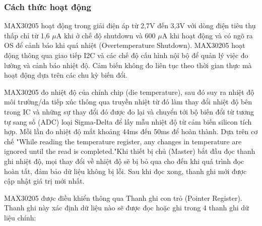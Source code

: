 \documentclass[../DoAn.tex]{subfiles}
\begin{document}
\subsubsection{Cách thức hoạt động}
MAX30205 hoạt động trong giải điện áp từ 2,7V đến 3,3V với dòng điện tiêu thụ thấp chỉ từ 1,6 $\mu$A khi ở chế độ shutdown và 600 $\mu$A khi hoạt động và có ngõ ra OS để cảnh báo khi quá nhiệt (Overtemperature Shutdown). MAX30205 hoạt động thông qua giao tiếp I2C và các chế độ cấu hình nội bộ để quản lý việc đo lường và cảnh báo nhiệt độ. Cảm biến không đo liên tục theo thời gian thực mà hoạt động dựa trên các chu kỳ biến đổi.

MAX30205 đo nhiệt độ của chính chip (die temperature), sau đó suy ra nhiệt độ môi trường/da tiếp xúc thông qua truyền nhiệt từ đó làm thay đổi nhiệt độ bên trong IC và những sự thay đổi đó được đo lại và chuyển tới bộ biến đổi từ tương tự sang số (ADC) loại Sigma-Delta để lấy mẫu nhiệt độ từ cảm biến silicon tích hợp. Mỗi lần đo nhiệt độ mất khoảng 44ms đến 50ms để hoàn thành. Dựa trên cơ chế "While reading the temperature register, any changes in temperature are ignored until the read is completed."Khi thiết bị chủ (Master) bắt đầu đọc thanh ghi nhiệt độ, mọi thay đổi về nhiệt độ sẽ bị bỏ qua cho đến khi quá trình đọc hoàn tất, đảm bảo dữ liệu không bị lỗi. Sau khi đọc xong, thanh ghi mới được cập nhật giá trị mới nhất.

MAX30205 được điều khiển thông qua Thanh ghi con trỏ (Pointer Register). Thanh ghi này xác định dữ liệu nào sẽ được đọc hoặc ghi trong 4 thanh ghi dữ liệu chính:
\end{document}
